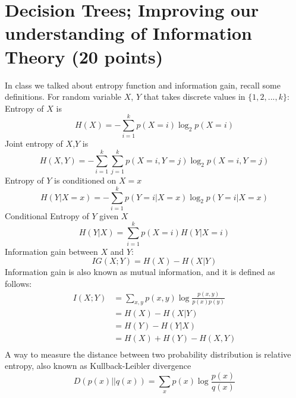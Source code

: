 \documentclass{article}
\begin{document}
\newpage

\section{Decision Trees; Improving our understanding of Information Theory (20 points)}
In class we talked about entropy function and information gain, recall some definitions. For random variable $X$, $Y$ that takes discrete values in $\{1,2,...,k\}$:\\
Entropy of $X$ is $$H(X) = -\sum_{i=1}^k p(X=i)\log_2 p(X=i)$$
Joint entropy of $X$,$Y$ is $$H(X,Y) = -\sum_{i=1}^k\sum_{j=1}^k p(X=i,Y=j)\log_2 p(X=i,Y=j)$$
Entropy of $Y$ is conditioned on $X=x$ $$H(Y|X=x) = -\sum_{i=1}^k p(Y=i|X=x)\log_2 p(Y=i|X=x)$$
Conditional Entropy of $Y$ given $X$ $$H(Y|X) = \sum_{i=1}^k p(X=i)H(Y|X=i)$$
Information gain between $X$ and $Y$:
    $$IG(X;Y) = H(X)-H(X|Y)$$
Information gain is also known as mutual information, and it is defined as follows:
\begin{align*}
I(X;Y) &= \sum_{x,y} p(x,y) \log \frac{p(x,y)}{p(x)p(y)}\\
&=H(X) - H(X|Y)\\
&=H(Y) - H(Y|X)\\
&=H(X) +H(Y) - H(X,Y)\\
\end{align*}
A way to measure the distance between two probability distribution is relative entropy, also known as Kullback-Leibler divergence
    $$D(p(x)||q(x)) = \sum_x p(x)\log\frac{p(x)}{q(x)}$$
\end{document}
